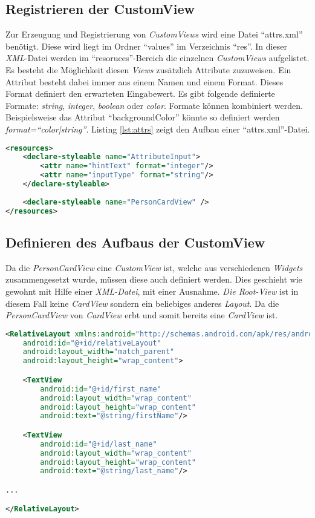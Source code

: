 \subsection{Registrieren der CustomView}
Zur Erzeugung und Registrierung von \textit{CustomViews} wird eine Datei \enquote{attrs.xml} benötigt. Diese wird liegt im Ordner \enquote{values} im Verzeichnis \enquote{res}. 
In dieser \textit{XML}-Datei werden im \enquote{resoruces}-Bereich die einzelnen \textit{CustomViews} aufgelistet. Es besteht die Möglichkeit diesen \textit{Views} zusätzlich Attribute zuzuweisen. Ein Attribut besteht dabei immer aus einem Namen und einem Format. Dieses Format definiert den erwarteten Eingabewert. Es gibt folgende definierte Formate: \textit{string}, \textit{integer}, \textit{boolean} oder \textit{color}. 
Formate können kombiniert werden. Beispielsweise das Attribut \enquote{backgroundColor} könnte so definiert werden \textit{format=\enquote{color|string}}. Listing \ref{lst:attrs} zeigt den Aufbau einer \enquote{attrs.xml}-Datei.

\newpage
\begin{lstlisting}[label=lst:attrs,
language=xml,
firstnumber=1,
caption=Aufbau einer \textit{attrs.xml} - Datei]				  
<resources>
	<declare-styleable name="AttributeInput">
		<attr name="hintText" format="integer"/>
		<attr name="inputType" format="string"/>
	</declare-styleable>
	
	<declare-styleable name="PersonCardView" />
</resources>
\end{lstlisting}

\subsection{Definieren des Aufbaus der CustomView}

Da die \textit{PersonCardView} eine \textit{CustomView} ist, welche aus verschiedenen \textit{Widgets} zusammengesetzt wurde, müssen diese auch definiert werden. Dies geschieht wie gewohnt mit Hilfe einer \textit{XML-Datei}, mit einer Ausnahme. \textit{Die Root-View} ist in diesem Fall keine \textit{CardView} sondern ein beliebiges anderes \textit{Layout}. Da die \textit{PersonCardView} von \textit{CardView} erbt und somit bereits eine \textit{CardView} ist.

\begin{lstlisting}[label=lst:personCardViewXml,
language=xml,
firstnumber=1,
caption=Aufbau der \textit{PersonCardView} mit Hilfe einer \textit{XML}-Datei]				  
<RelativeLayout xmlns:android="http://schemas.android.com/apk/res/android"
	android:id="@+id/relativeLayout"
	android:layout_width="match_parent"
	android:layout_height="wrap_content">

	<TextView
		android:id="@+id/first_name"
		android:layout_width="wrap_content"
		android:layout_height="wrap_content"
		android:text="@string/firstName"/>

	<TextView
		android:id="@+id/last_name"
		android:layout_width="wrap_content"
		android:layout_height="wrap_content"
		android:text="@string/last_name"/>

...

</RelativeLayout>
\end{lstlisting}

